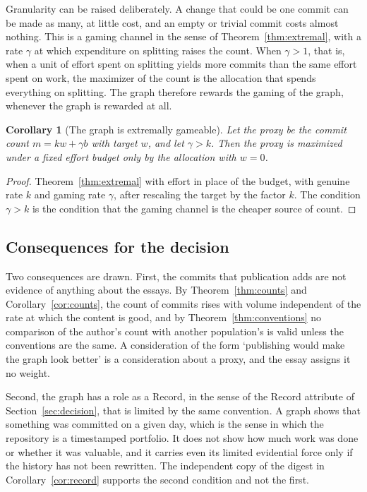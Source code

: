 \documentclass[11pt]{article}
\theoremstyle{plain}
\newtheorem{corollary}[theorem]{Corollary}
\theoremstyle{definition}
\theoremstyle{remark}
\begin{document}
Granularity can be raised deliberately. A change that could be one commit can be made as many, at little cost, and an empty or trivial commit costs almost nothing. This is a gaming channel in the sense of Theorem~\ref{thm:extremal}, with a rate $\gamma$ at which expenditure on splitting raises the count. When $\gamma>1$, that is, when a unit of effort spent on splitting yields more commits than the same effort spent on work, the maximizer of the count is the allocation that spends everything on splitting. The graph therefore rewards the gaming of the graph, whenever the graph is rewarded at all.

\begin{corollary}[The graph is extremally gameable]\label{cor:graphgame}
Let the proxy be the commit count $m=kw+\gamma b$ with target $w$, and let $\gamma>k$. Then the proxy is maximized under a fixed effort budget only by the allocation with $w=0$.
\end{corollary}

\begin{proof}
Theorem~\ref{thm:extremal} with effort in place of the budget, with genuine rate $k$ and gaming rate $\gamma$, after rescaling the target by the factor $k$. The condition $\gamma>k$ is the condition that the gaming channel is the cheaper source of count. \qedhere
\end{proof}

\subsection{Consequences for the decision}

Two consequences are drawn. First, the commits that publication adds are not evidence of anything about the essays. By Theorem~\ref{thm:counts} and Corollary~\ref{cor:counts}, the count of commits rises with volume independent of the rate at which the content is good, and by Theorem~\ref{thm:conventions} no comparison of the author's count with another population's is valid unless the conventions are the same. A consideration of the form `publishing would make the graph look better' is a consideration about a proxy, and the essay assigns it no weight.

Second, the graph has a role as a Record, in the sense of the Record attribute of Section~\ref{sec:decision}, that is limited by the same convention. A graph shows that something was committed on a given day, which is the sense in which the repository is a timestamped portfolio. It does not show how much work was done or whether it was valuable, and it carries even its limited evidential force only if the history has not been rewritten. The independent copy of the digest in Corollary~\ref{cor:record} supports the second condition and not the first.
\end{document}
